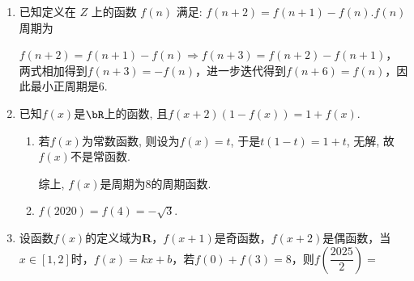 \begin{enumerate}
\begin{enumerate}
\begin{jieda}
        代入$x = 0, y = 0$，有$f(0) + f(0) = f(0) \cdot f(0)$，故$f(0) = 0$或$f(0) = 2$ \\
        代入$x = 1, y = 1$，由$f(2) + f(0) = f(1) \cdot f(1)$，故$f(2) = -f(0)$ \\
        因此$f(2022) = -2 \mbox{或} 0$
    \end{jieda}
    \item 已知定义在 $Z$ 上的函数 $f\left( n\right)$ 满足: $f\left( {n + 2}\right)  = f\left( {n + 1}\right)  - f\left( n\right) .f\left( n\right)$ 周期为
    \begin{jieda}
        $f\left( {n + 2}\right)  = f\left( {n + 1}\right)  - f\left( n\right) \Longrightarrow f\left( {n + 3}\right)  = f\left( {n + 2}\right)  - f\left( n+1\right)$，两式相加得到$f(n+3) = -f(n)$，进一步迭代得到$f(n+6) = f(n)$，因此最小正周期是6.
    \end{jieda}
    \item 已知$f(x)$是$\bR$上的函数, 且$f(x+2)(1-f(x))=1+f(x)$. 
    \begin{jieda}
    \begin{enumerate}[1.]
    \item 若$f(x)$为常数函数, 则设为$f(x)=t$, 于是$t(1-t)=1+t$, 无解, 故$f(x)$不是常函数. 
    综上, $f(x)$是周期为8的周期函数.
    \item $f(2020)=f(4)=-\sqrt{3}$. 
    \end{enumerate}
    \end{jieda}
\item 设函数$f(x)$的定义域为$\mathbf{R}$，$f(x+1)$是奇函数，$f(x+2)$是偶函数，当$x \in [1, 2]$时，$f(x) = kx+b$，若$f(0) + f(3) = 8$，则$f\left(\dfrac{2025}{2}\right) = $

\end{enumerate}
\end{enumerate}

